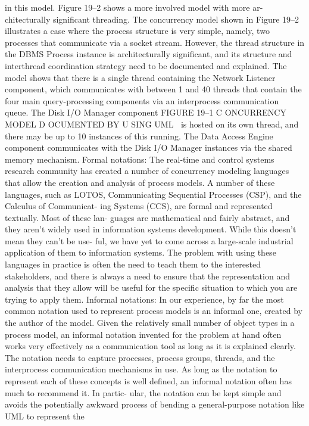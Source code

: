 in this model. Figure 19–2 shows a more involved model with more ar-
chitecturally significant threading.
The concurrency model shown in Figure 19–2 illustrates a case
where the process structure is very simple, namely, two processes that
communicate via a socket stream. However, the thread structure in the
DBMS Process instance is architecturally significant, and its structure
and interthread coordination strategy need to be documented and
explained. The model shows that there is a single thread containing the
Network Listener component, which communicates with between 1 and
40 threads that contain the four main query-processing components via
an interprocess communication queue. The Disk I/O Manager component
FIGURE 19–1 C ONCURRENCY MODEL D OCUMENTED BY U SING UML
is hosted on its own thread, and there may be up to 10 instances of this
running. The Data Access Engine component communicates with the
Disk I/O Manager instances via the shared memory mechanism.
Formal notations: The real-time and control systems research community has
created a number of concurrency modeling languages that allow the creation
and analysis of process models. A number of these languages, such as LOTOS,
Communicating Sequential Processes (CSP), and the Calculus of Communicat-
ing Systems (CCS), are formal and represented textually. Most of these lan-
guages are mathematical and fairly abstract, and they aren’t widely used in
information systems development. While this doesn’t mean they can’t be use-
ful, we have yet to come across a large-scale industrial application of them to
information systems. The problem with using these languages in practice is
often the need to teach them to the interested stakeholders, and there is always
a need to ensure that the representation and analysis that they allow will be
useful for the specific situation to which you are trying to apply them.
Informal notations: In our experience, by far the most common notation
used to represent process models is an informal one, created by the
author of the model. Given the relatively small number of object types in
a process model, an informal notation invented for the problem at hand
often works very effectively as a communication tool as long as it is
explained clearly. The notation needs to capture processes, process
groups, threads, and the interprocess communication mechanisms in
use. As long as the notation to represent each of these concepts is well
defined, an informal notation often has much to recommend it. In partic-
ular, the notation can be kept simple and avoids the potentially awkward
process of bending a general-purpose notation like UML to represent the
